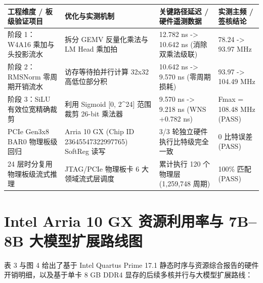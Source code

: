 \documentclass[11pt,a4paper]{article}
\begin{document}
{\footnotesize\renewcommand{\arraystretch}{1.14}\begin{longtable}{@{}L{0.23\textwidth}L{0.27\textwidth}L{0.24\textwidth}L{0.16\textwidth}@{}}\toprule

\textbf{工程维度 /\allowbreak{} 板级验证项目} & \textbf{优化与实测机制} & \textbf{关键路径延迟 /\allowbreak{} 硬件遥测数据} & \textbf{实测主频 /\allowbreak{} 签核结论}\\\midrule\endhead

阶段 1：W4A16 乘加与头投影流水 & 拆分 GEMV 反量化乘法与 LM Head 乘加拍 & 12.782 ns -> 10.642 ns (\allowbreak{}消除双乘法级联)\allowbreak{} & 78.24 -> 93.97 MHz\\[2pt]

阶段 2：RMSNorm 零周期开销流水 & 访存等待拍并行计算 32x32 高低位部分积 & 10.642 ns -> 9.570 ns (\allowbreak{}零周期损耗)\allowbreak{} & 93.97 -> 104.49 MHz\\[2pt]

阶段 3：SiLU 有效位宽精确裁剪 & 利用 Sigmoid [\allowbreak{}0,\allowbreak{} 2\textasciicircum{}24]\allowbreak{} 范围裁剪 26-bit 乘法器 & 9.570 ns -> 9.218 ns (\allowbreak{}WNS +\allowbreak{}0.782 ns)\allowbreak{} & Fmax =\allowbreak{} 108.48 MHz (\allowbreak{}PASS)\allowbreak{}\\[2pt]

PCIe Gen3x8 BAR0 物理板级回归 & Arria 10 GX (\allowbreak{}Chip ID 23645547\allowbreak{}32299776\allowbreak{}5)\allowbreak{} SoftReg 读写 & 3/\allowbreak{}3 轮独立硬件执行比特级完全一致 & 0 比特误差 (\allowbreak{}PASS)\allowbreak{}\\[2pt]

24 层时分复用物理板级流式推理 & JTAG/\allowbreak{}PCIe 物理板卡 6 大领域流式层调度 & 累计执行 120 个物理层 (\allowbreak{}1,\allowbreak{}259,\allowbreak{}748 周期)\allowbreak{} & 100\% 匹配 (\allowbreak{}PASS)\allowbreak{}\\[2pt]

\bottomrule\end{longtable}}

\section{Intel Arria 10 GX 资源利用率与 7B–8B 大模型扩展路线图}

表 3 与图 4 给出了基于 Intel Quartus Prime 17.1 静态时序与资源综合报告的硬件开销明细，以及基于单卡 8 GB DDR4 显存的后续多核并行与大模型扩展路线：
\end{document}
